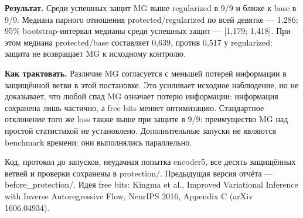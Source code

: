 \documentclass[10pt,a4paper]{article}
\begin{document}
\textbf{Результат.} Среди успешных защит MG выше regularized в 9/9 и ближе к base в 9/9. Медиана парного отношения protected/regularized по всей девятке --- 1,286; 95\% bootstrap-интервал медианы среди успешных защит --- [1,179; 1,418]. При этом медиана protected/base составляет 0,639, против 0,517 у regularized: защита не возвращает MG к исходному контролю.

\textbf{Как трактовать.} Различие MG согласуется с меньшей потерей информации в защищённой ветви в этой постановке. Это усиливает исходное наблюдение, но не доказывает, что любой спад MG означает потерю информации: информация сохранена лишь частично, а free bits меняет оптимизацию. Стандартное отклонение того же loss также выше при защите в 9/9: преимущество MG над простой статистикой не установлено. Дополнительные запуски не являются benchmark времени: они выполнялись параллельно.

Код, протокол до запусков, неудачная попытка encoder5, все десять защищённых ветвей и проверки сохранены в protection/. Предыдущая версия отчёта --- before\_protection/. Идея free bits: Kingma et al., Improved Variational Inference with Inverse Autoregressive Flow, NeurIPS 2016, Appendix C (arXiv 1606.04934).
\end{document}
